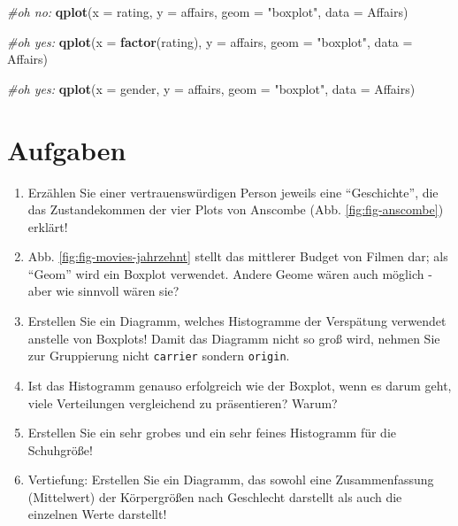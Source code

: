 \documentclass[12pt,ngerman,]{book}
\makeatletter
\newenvironment{Shaded}{\begin{snugshade}}{\end{snugshade}}
\newcommand{\KeywordTok}[1]{\textcolor[rgb]{0.13,0.29,0.53}{\textbf{#1}}}
\newcommand{\DataTypeTok}[1]{\textcolor[rgb]{0.13,0.29,0.53}{#1}}
\newcommand{\StringTok}[1]{\textcolor[rgb]{0.31,0.60,0.02}{#1}}
\newcommand{\CommentTok}[1]{\textcolor[rgb]{0.56,0.35,0.01}{\textit{#1}}}
\newcommand{\NormalTok}[1]{#1}
\newenvironment{kframe}{%
\medskip{}
\setlength{\fboxsep}{.8em}
 \def\at@end@of@kframe{}%
 \ifinner\ifhmode%
  \def\at@end@of@kframe{\end{minipage}}%
  \begin{minipage}{\columnwidth}%
 \fi\fi%
 \def\FrameCommand##1{\hskip\@totalleftmargin \hskip-\fboxsep
 \colorbox{shadecolor}{##1}\hskip-\fboxsep
     \hskip-\linewidth \hskip-\@totalleftmargin \hskip\columnwidth}%
 \MakeFramed {\advance\hsize-\width
   \@totalleftmargin\z@ \linewidth\hsize
   \@setminipage}}%
 {\par\unskip\endMakeFramed%
 \at@end@of@kframe}
\renewenvironment{Shaded}{\begin{kframe}}{\end{kframe}}
\theoremstyle{definition}
\theoremstyle{definition}
\theoremstyle{remark}
\makeatother
\begin{document}
\begin{Shaded}
\begin{Highlighting}[]
\CommentTok{#oh no: }
\KeywordTok{qplot}\NormalTok{(}\DataTypeTok{x =}\NormalTok{ rating, }\DataTypeTok{y =}\NormalTok{ affairs, }\DataTypeTok{geom =} \StringTok{"boxplot"}\NormalTok{, }\DataTypeTok{data =}\NormalTok{ Affairs)}

\CommentTok{#oh yes: }
\KeywordTok{qplot}\NormalTok{(}\DataTypeTok{x =} \KeywordTok{factor}\NormalTok{(rating), }\DataTypeTok{y =}\NormalTok{ affairs, }\DataTypeTok{geom =} \StringTok{"boxplot"}\NormalTok{, }\DataTypeTok{data =}\NormalTok{ Affairs)}

\CommentTok{#oh yes: }
\KeywordTok{qplot}\NormalTok{(}\DataTypeTok{x =}\NormalTok{ gender, }\DataTypeTok{y =}\NormalTok{ affairs, }\DataTypeTok{geom =} \StringTok{"boxplot"}\NormalTok{, }\DataTypeTok{data =}\NormalTok{ Affairs)}
\end{Highlighting}
\end{Shaded}

\section{Aufgaben}\label{aufgaben-9}

\begin{enumerate}
\def\labelenumi{\arabic{enumi}.}
\item
  Erzählen Sie einer vertrauenswürdigen Person jeweils eine
  ``Geschichte'', die das Zustandekommen der vier Plots von Anscombe
  (Abb. \ref{fig:fig-anscombe}) erklärt!
\item
  Abb. \ref{fig:fig-movies-jahrzehnt} stellt das mittlerer Budget von
  Filmen dar; als ``Geom'' wird ein Boxplot verwendet. Andere Geome
  wären auch möglich - aber wie sinnvoll wären sie?
\item
  Erstellen Sie ein Diagramm, welches Histogramme der Verspätung
  verwendet anstelle von Boxplots! Damit das Diagramm nicht so groß
  wird, nehmen Sie zur Gruppierung nicht \texttt{carrier} sondern
  \texttt{origin}.
\item
  Ist das Histogramm genauso erfolgreich wie der Boxplot, wenn es darum
  geht, viele Verteilungen vergleichend zu präsentieren? Warum?
\item
  Erstellen Sie ein sehr grobes und ein sehr feines Histogramm für die
  Schuhgröße!
\item
  Vertiefung: Erstellen Sie ein Diagramm, das sowohl eine
  Zusammenfassung (Mittelwert) der Körpergrößen nach Geschlecht
  darstellt als auch die einzelnen Werte darstellt!
\end{enumerate}
\end{document}
